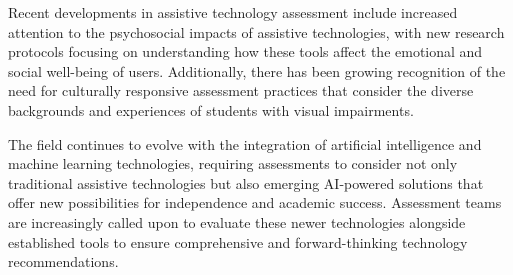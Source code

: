 Recent developments in assistive technology assessment include increased attention to the psychosocial impacts of assistive technologies, with new research protocols focusing on understanding how these tools affect the emotional and social well-being of users. Additionally, there has been growing recognition of the need for culturally responsive assessment practices that consider the diverse backgrounds and experiences of students with visual impairments.

The field continues to evolve with the integration of artificial intelligence and machine learning technologies, requiring assessments to consider not only traditional assistive technologies but also emerging AI-powered solutions that offer new possibilities for independence and academic success. Assessment teams are increasingly called upon to evaluate these newer technologies alongside established tools to ensure comprehensive and forward-thinking technology recommendations.
